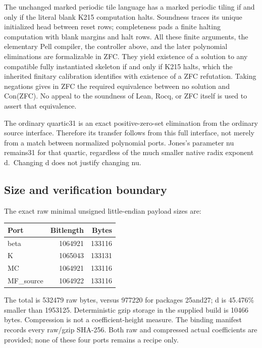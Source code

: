 \documentclass[
  10pt,
]{article}
\begin{document}
The unchanged marked periodic tile language has a marked periodic tiling
if and only if the literal blank K215 computation halts. Soundness
traces its unique initialized head between reset rows; completeness pads
a finite halting computation with blank margins and halt rows. All these
finite arguments, the elementary Pell compiler, the controller above,
and the later polynomial eliminations are formalizable in ZFC. They
yield existence of a solution to any compatible fully instantiated
skeleton if and only if K215 halts, which the inherited finitary
calibration identifies with existence of a ZFC refutation. Taking
negations gives in ZFC the required equivalence between no solution and
Con(ZFC). No appeal to the soundness of Lean, Rocq, or ZFC itself is
used to assert that equivalence.

The ordinary quartic31 is an exact positive-zero-set elimination from
the ordinary source interface. Therefore its transfer follows from this
full interface, not merely from a match between normalized polynomial
ports. Jones's parameter nu remains31 for that quartic, regardless of
the much smaller native radix exponent d.~Changing d does not justify
changing nu.

\subsection{Size and verification
boundary}\label{size-and-verification-boundary}

The exact raw minimal unsigned little-endian payload sizes are:

\begin{longtable}[]{@{}lrr@{}}
\toprule\noalign{}
Port & Bitlength & Bytes \\
\midrule\noalign{}
\endhead
\bottomrule\noalign{}
\endlastfoot
beta & 1064921 & 133116 \\
K & 1065043 & 133131 \\
MC & 1064921 & 133116 \\
MF\_source & 1064922 & 133116 \\
\end{longtable}

The total is 532479 raw bytes, versus 977220 for packages 25and27; d is
45.476\% smaller than 1953125. Deterministic gzip storage in the
supplied build is 10466 bytes. Compression is not a coefficient-height
measure. The binding manifest records every raw/gzip SHA-256. Both raw
and compressed actual coefficients are provided; none of these four
ports remains a recipe only.
\end{document}
